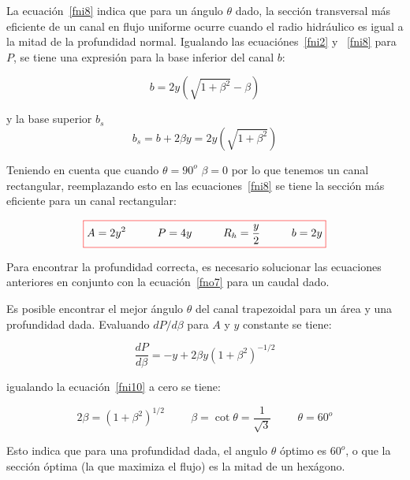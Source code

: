 \documentclass[11pt, oneside]{article}
\begin{document}
La ecuaci\'on~\ref{fni8} indica que para un \'angulo $\theta$ dado, la secci\'on transversal m\'as eficiente de un canal en flujo uniforme ocurre cuando el radio hidr\'aulico es igual a la mitad de la profundidad normal. Igualando las ecuaci\'ones~\ref{fni2} y ~\ref{fni8} para $P$, se tiene una expresi\'on para la base inferior del canal $b$:

\begin{equation}
b = 2y\left(\sqrt{1+\beta^2} - \beta \right)
\label{fni8a}
\end{equation}
 
y la base superior $b_s$
\begin{equation}
b_s =b+2\beta y = 2y\left(\sqrt{1+\beta^2} \right)
\label{fni8b}
\end{equation}

Teniendo en cuenta que cuando $\theta = 90^o$ $\beta = 0$ por lo que tenemos un canal rectangular, reemplazando esto en las ecuaciones~\ref{fni8} se tiene la secci\'on m\'as eficiente para un canal rectangular:
    
\begin{equation}
\color{red}\boxed{\color{black} A = 2y^2 \hspace{1cm} P=4y  \hspace{1cm} R_h = \frac{y}{2} \hspace{1cm} b = 2y }
\label{fni9}
\end{equation}

Para encontrar la profundidad correcta, es necesario solucionar las ecuaciones anteriores en conjunto con la ecuaci\'on~\ref{fno7} para un caudal dado. 

Es posible encontrar el mejor \'angulo $\theta$ del canal trapezoidal para un \'area y una profundidad dada. Evaluando $dP/d\beta$ para $A$ y $y$ constante se tiene:

\begin{equation}
\frac{dP}{d\beta} = -y +2\beta y\left( 1 + \beta^2 \right)^{-1/2} 
\label{fni10}
\end{equation}

igualando la ecuaci\'on~\ref{fni10} a cero se tiene:

\begin{equation}
2\beta = \left( 1 + \beta^2 \right)^{1/2} \hspace{1cm} \beta=\cot \theta = \frac{1}{\sqrt{3}} \hspace{1cm} \theta=60^o
\label{fni10}
\end{equation}

Esto indica que para una profundidad dada, el angulo $\theta$ \'optimo es $60^o$, o que la secci\'on \'optima (la que maximiza el flujo) es la mitad de un hex\'agono. 
\end{document}
